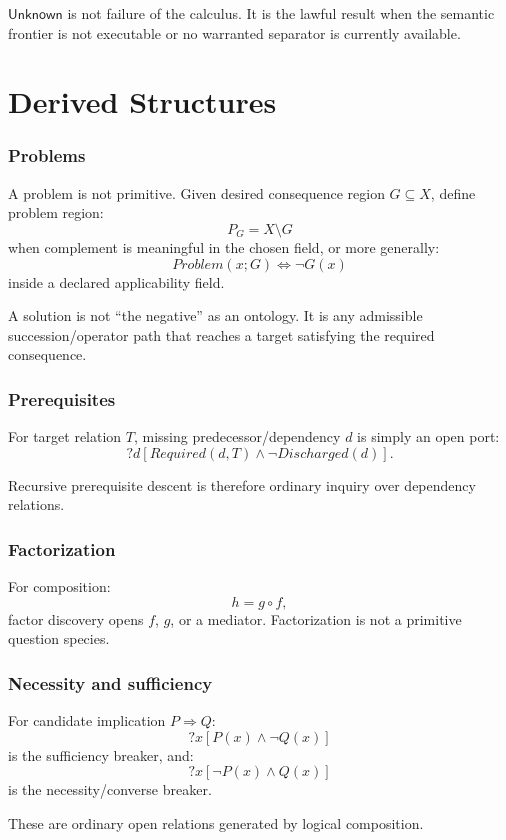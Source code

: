 \documentclass[11pt,oneside]{article}
\begin{document}
\(\mathsf{Unknown}\) is not failure of the calculus.  It is the lawful result when the semantic frontier is not executable or no warranted separator is currently available.

\part{Derived Structures}

\section{Problems}

A problem is not primitive.  Given desired consequence region \(G\subseteq X\), define problem region:
\[
P_G=X\setminus G
\]
when complement is meaningful in the chosen field, or more generally:
\[
Problem(x;G)\iff \neg G(x)
\]
inside a declared applicability field.

A solution is not ``the negative'' as an ontology.  It is any admissible succession/operator path that reaches a target satisfying the required consequence.

\section{Prerequisites}

For target relation \(T\), missing predecessor/dependency \(d\) is simply an open port:
\[
?d[
Required(d,T)
\land
\neg Discharged(d)
].
\]

Recursive prerequisite descent is therefore ordinary inquiry over dependency relations.

\section{Factorization}

For composition:
\[
h=g\circ f,
\]
factor discovery opens \(f\), \(g\), or a mediator.  Factorization is not a primitive question species.

\section{Necessity and sufficiency}

For candidate implication \(P\Rightarrow Q\):
\[
\boxed{
?x[P(x)\land\neg Q(x)]
}
\]
is the sufficiency breaker, and:
\[
\boxed{
?x[\neg P(x)\land Q(x)]
}
\]
is the necessity/converse breaker.

These are ordinary open relations generated by logical composition.
\end{document}
